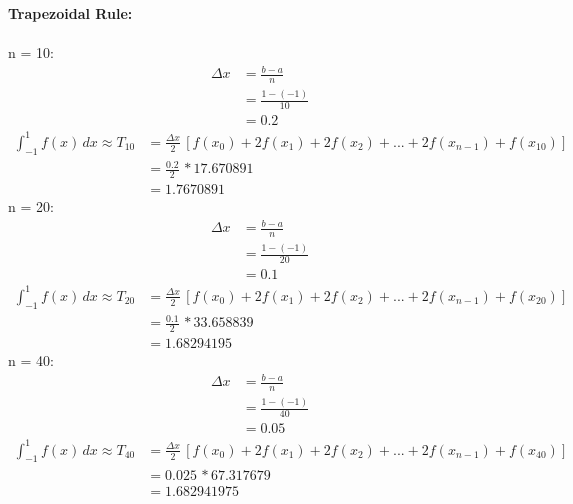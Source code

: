 \documentclass{article}
\begin{document}
    \textbf{Trapezoidal Rule:} \\\\
    n = 10:\\
    \begin{align*}
        \Delta x &= \frac{b-a}{n}\\
        &= \frac{1-(-1)}{10}\\
        &= 0.2
    \end{align*}
    \begin{align*}
        \int_{-1}^{1} f(x) \, dx \approx T_{10} &= \frac{\Delta x}{2}\,[f(x_0)+2f(x_1)+2f(x_2)+...+2f(x_{n-1})+f(x_{10})] \\
        &=\frac{0.2}{2} \, * 17.670891 \\
        &=1.7670891
    \end{align*}
    n = 20:\\
    \begin{align*}
        \Delta x &= \frac{b-a}{n}\\
        &= \frac{1-(-1)}{20}\\
        &= 0.1
    \end{align*}
    \begin{align*}
        \int_{-1}^{1} f(x) \, dx \approx T_{20} &= \frac{\Delta x}{2}\,[f(x_0)+2f(x_1)+2f(x_2)+...+2f(x_{n-1})+f(x_{20})] \\
        &=\frac{0.1}{2} \, * 33.658839 \\
        &=1.68294195
    \end{align*}
    n = 40:\\
    \begin{align*}
        \Delta x &= \frac{b-a}{n}\\
        &= \frac{1-(-1)}{40}\\
        &= 0.05
    \end{align*}
    \begin{align*}
        \int_{-1}^{1} f(x) \, dx \approx T_{40} &= \frac{\Delta x}{2}\,[f(x_0)+2f(x_1)+2f(x_2)+...+2f(x_{n-1})+f(x_{40})] \\
        &=0.025 \, * 67.317679 \\
        &=1.682941975
    \end{align*} \\\\
\end{document}
